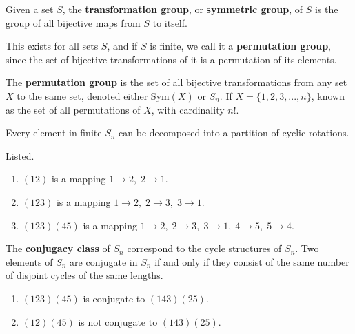   \begin{definition}
    Given a set $S$, the \textbf{transformation group}, or \textbf{symmetric group}, of $S$ is the group of all bijective maps from $S$ to itself. 
  \end{definition} 

  This exists for all sets $S$, and if $S$ is finite, we call it a \textbf{permutation group}, since the set of bijective transformations of it is a permutation of its elements. 

  \begin{definition}
    The \textbf{permutation group} is the set of all bijective transformations from any set $X$ to the same set, denoted either Sym$(X)$ or $S_n$. If $X = \{1, 2, 3 ,... , n\}$, known as the set of all permutations of $X$, with cardinality $n!$. 
  \end{definition}

  \begin{lemma}
    Every element in finite $S_{n}$ can be decomposed into a partition of cyclic rotations.
  \end{lemma}

  \begin{example}
    Listed.
    \begin{enumerate}
      \item $(1 2)$ is a mapping $1 \rightarrow 2,\; 2 \rightarrow 1$. 
      \item $(1 2 3)$ is a mapping $1\rightarrow 2,\; 2 \rightarrow 3,\; 3 \rightarrow 1$. 
      \item $(1 2 3) (4 5)$ is a mapping $1\rightarrow 2,\; 2 \rightarrow 3,\; 3 \rightarrow 1, \;4 \rightarrow 5, \;5 \rightarrow 4$. 
    \end{enumerate}
  \end{example}

  \begin{definition}
    The \textbf{conjugacy class} of $S_{n}$ correspond to the cycle structures of $S_{n}$. Two elements of $S_{n}$ are conjugate in $S_{n}$ if and only if they consist of the same number of disjoint cycles of the same lengths. 
  \end{definition} 

  \begin{example}
    \begin{enumerate}
      \item $(1 2 3) (4 5)$ is conjugate to $(1 4 3) (2 5)$.
      \item $(1 2) (4 5)$ is not conjugate to $(1 4 3) (2 5)$. 
    \end{enumerate}
  \end{example}

